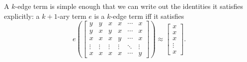 \documentclass[letterpaper,11pt]{article}
\begin{document}
A $k$-edge term is simple enough that we can write out the identities it satisfies explicitly: a $k+1$-ary term $e$ is a $k$-edge term iff it satisfies
\[
e\left(\begin{bmatrix}y & y & x & x & \cdots & x\\ y & x & y & x & \cdots & x\\ x & x & x & y & \cdots & x\\ \vdots & \vdots & \vdots & \vdots & \ddots & \vdots \\ x & x & x & x & \cdots & y \end{bmatrix}\right) \approx \begin{bmatrix}x\\ x\\ x\\ \vdots \\ x\end{bmatrix}.
\]
\end{document}
